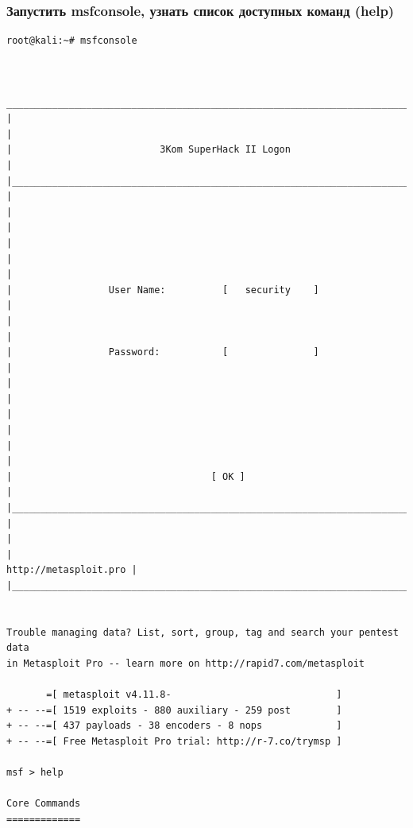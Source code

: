 \documentclass[10pt,a4paper,titlepage]{article}
\begin{document}
\subsubsection{Запустить msfconsole, узнать список доступных команд (help)}
\begin{verbatim}
root@kali:~# msfconsole
                                                  

 ______________________________________________________________________________
|                                                                              |
|                          3Kom SuperHack II Logon                             |
|______________________________________________________________________________|
|                                                                              |
|                                                                              |
|                                                                              |
|                 User Name:          [   security    ]                        |
|                                                                              |
|                 Password:           [               ]                        |
|                                                                              |
|                                                                              |
|                                                                              |
|                                   [ OK ]                                     |
|______________________________________________________________________________|
|                                                                              |
|                                                        http://metasploit.pro |
|______________________________________________________________________________|


Trouble managing data? List, sort, group, tag and search your pentest data
in Metasploit Pro -- learn more on http://rapid7.com/metasploit

       =[ metasploit v4.11.8-                             ]
+ -- --=[ 1519 exploits - 880 auxiliary - 259 post        ]
+ -- --=[ 437 payloads - 38 encoders - 8 nops             ]
+ -- --=[ Free Metasploit Pro trial: http://r-7.co/trymsp ]

msf > help

Core Commands
=============


\end{verbatim}
\end{document}
